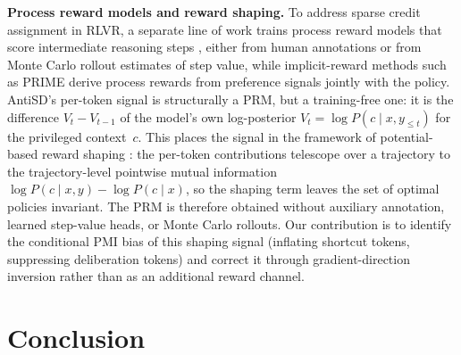 \documentclass{llmxive}
\begin{document}
\textbf{Process reward models and reward shaping.}
To address sparse credit assignment in RLVR, a separate line of work trains process reward models that score intermediate reasoning steps \citep{prm800k, math-shepherd, luo2024improve, setlur2025rewarding, lee2026efficient}, either from human annotations or from Monte Carlo rollout estimates of step value, while implicit-reward methods such as PRIME \citep{cui2025process} derive process rewards from preference signals jointly with the policy. AntiSD's per-token signal is structurally a PRM, but a training-free one: it is the difference $V_t - V_{t-1}$ of the model's own log-posterior $V_t = \log P(c \mid x, y_{\le t})$ for the privileged context~$c$. This places the signal in the framework of potential-based reward shaping \citep{ng1999policy}: the per-token contributions telescope over a trajectory to the trajectory-level pointwise mutual information $\log P(c\mid x,y) - \log P(c\mid x)$, so the shaping term leaves the set of optimal policies invariant. The PRM is therefore obtained without auxiliary annotation, learned step-value heads, or Monte Carlo rollouts. Our contribution is to identify the conditional PMI bias of this shaping signal (inflating shortcut tokens, suppressing deliberation tokens) and correct it through gradient-direction inversion rather than as an additional reward channel.

\vspace{-0.5em}

\section{Conclusion}
\label{sec:conclusion}
\vspace{-0.5em}
\end{document}
